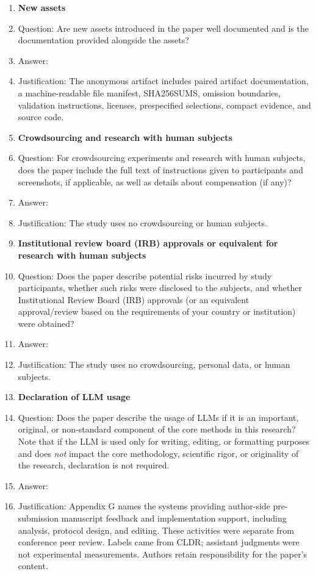 \begin{enumerate}
\item {\bf New assets}
  \item[] Question: Are new assets introduced in the paper well documented and is the documentation provided alongside the assets?
  \item[] Answer: \answerYes{}
  \item[] Justification: The anonymous artifact includes paired artifact documentation, a machine-readable file manifest, SHA256SUMS, omission boundaries, validation instructions, licenses, prespecified selections, compact evidence, and source code.

\item {\bf Crowdsourcing and research with human subjects}
  \item[] Question: For crowdsourcing experiments and research with human subjects, does the paper include the full text of instructions given to participants and screenshots, if applicable, as well as details about compensation (if any)?
  \item[] Answer: \answerNA{}
  \item[] Justification: The study uses no crowdsourcing or human subjects.

\item {\bf Institutional review board (IRB) approvals or equivalent for research with human subjects}
  \item[] Question: Does the paper describe potential risks incurred by study participants, whether such risks were disclosed to the subjects, and whether Institutional Review Board (IRB) approvals (or an equivalent approval/review based on the requirements of your country or institution) were obtained?
  \item[] Answer: \answerNA{}
  \item[] Justification: The study uses no crowdsourcing, personal data, or human subjects.

\item {\bf Declaration of LLM usage}
  \item[] Question: Does the paper describe the usage of LLMs if it is an important, original, or non-standard component of the core methods in this research? Note that if the LLM is used only for writing, editing, or formatting purposes and does \emph{not} impact the core methodology, scientific rigor, or originality of the research, declaration is not required.
  \item[] Answer: \answerYes{}
  \item[] Justification: Appendix G names the systems providing author-side pre-submission manuscript feedback and implementation support, including analysis, protocol design, and editing. These activities were separate from conference peer review. Labels came from CLDR; assistant judgments were not experimental measurements. Authors retain responsibility for the paper's content.

\end{enumerate}
